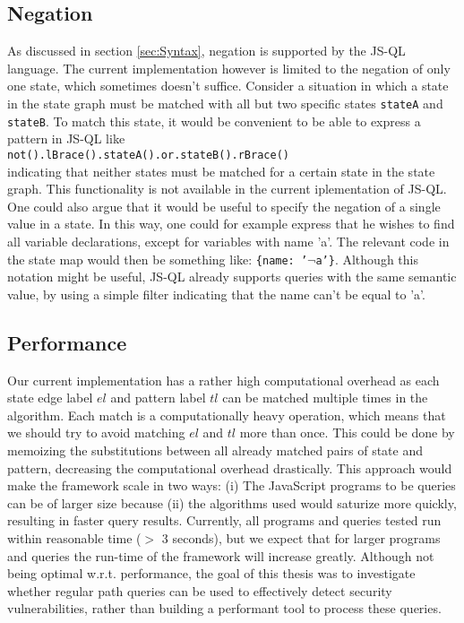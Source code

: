 \subsection*{Negation}

As discussed in section \ref{sec:Syntax}, negation is supported by the JS-QL language. The current implementation however is limited to the negation of only one state, which sometimes doesn't suffice. Consider a situation in which a state in the state graph must be matched with all but two specific states \texttt{stateA} and \texttt{stateB}. To match this state, it would be convenient to be able to express a pattern in JS-QL like \\\texttt{not().lBrace().stateA().or.stateB().rBrace()}\\indicating that neither states must be matched for a certain state in the state graph. This functionality is not available in the current iplementation of JS-QL. One could also argue that it would be useful to specify the negation of a single value in a state. In this way, one could for example express that he wishes to find all variable declarations, except for variables with name 'a'. The relevant code in the state map would then be something like: \texttt{\{name: '$\neg$a'\}}. Although this notation might be useful, JS-QL already supports queries with the same semantic value, by using a simple filter indicating that the name can't be equal to 'a'.

\subsection*{Performance}

Our current implementation has a rather high computational overhead as each state edge label $el$ and pattern label $tl$ can be matched multiple times in the algorithm. Each match is a computationally heavy operation, which means that we should try to avoid matching $el$ and $tl$ more than once. This could be done by memoizing the substitutions between all already matched pairs of state and pattern, decreasing the computational overhead drastically. This approach would make the framework scale in two ways: (i) The JavaScript programs to be queries can be of larger size because (ii) the algorithms used would saturize more quickly, resulting in faster query results. Currently, all programs and queries tested run within reasonable time ($>$ 3 seconds), but we expect that for larger programs and queries the run-time of the framework will increase greatly. Although not being optimal w.r.t. performance, the goal of this thesis was to investigate whether regular path queries can be used to effectively detect security vulnerabilities, rather than building a performant tool to process these queries.

